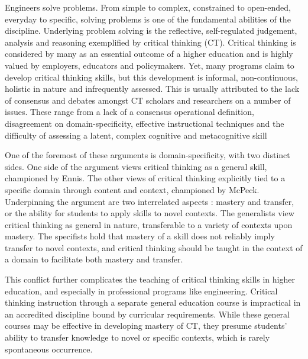 Engineers solve problems.  From simple to complex, constrained to open-ended, everyday to specific, solving problems is one of the fundamental abilities of the discipline.  Underlying problem solving is the reflective, self-regulated judgement, analysis and reasoning exemplified by critical thinking (CT).  Critical thinking is considered by many as an essential outcome of a higher education and is highly valued by employers, educators and policymakers.  Yet, many  programs claim to develop critical thinking skills, but this development is informal, non-continuous, holistic in nature and infrequently assessed\cite{Paul:1997ti,Ahern:2012ey}.  This is usually attributed to the lack of consensus and debates amongst CT scholars and researchers on a number of issues.  These range from a lack of a consensus operational definition, disagreement on domain-specificity\cite{Ennis:1989bm,McPeck:1990is}, effective instructional techniques\cite{Tsui:2002cc} and the difficulty of assessing a latent, complex cognitive and metacognitive skill\cite{Ennis:1993us,Halpern:2003tt}
 
One of the foremost of these arguments is domain-specificity, with two distinct sides.  One side of the argument views critical thinking as a general skill, championed by Ennis\cite{Ennis:1989bm}.  The other views of critical thinking explicitly tied to a specific domain through content and context, championed by McPeck\cite{McPeck:1990is}.  Underpinning the argument are two interrelated aspects : mastery and transfer, or the ability for students to apply skills to novel contexts. The generalists view critical thinking as general in nature, transferable to a variety of contexts upon mastery.  The specifists hold that mastery of a skill does not reliably imply transfer to novel contexts, and critical thinking should be taught in the context of a domain to facilitate both mastery and transfer.  

This conflict further complicates the teaching of critical thinking skills in higher education, and especially in professional programs like engineering.  Critical thinking instruction through a separate general education course is impractical in an accredited discipline bound by curricular requirements.  While these general courses may be effective in developing mastery of CT, they presume students’ ability to transfer knowledge to novel or specific contexts, which is rarely spontaneous occurrence\cite{Abrami:2008td}.

